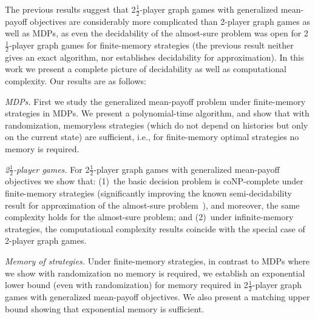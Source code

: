 \documentclass{article}
\newcommand{\half}{$\frac{\text{1}}{\text{2}}$}
\begin{document}
\smallskip{}
The previous results suggest that 2\half-player graph games with generalized 
mean-payoff objectives are considerably more complicated than 2-player graph 
games as well as MDPs, as even the decidability of the almost-sure problem was 
open for 2\half-player graph games for finite-memory strategies (the previous 
result neither gives an exact algorithm, nor establishes decidability for 
approximation).
In this work we present a complete picture of decidability as well as computational 
complexity. 
Our results are as follows:
\begin{compactenum}

\item {\em MDPs.} First we study the generalized mean-payoff problem under 
finite-memory strategies in MDPs. We present a polynomial-time algorithm,
and show that with randomization, memoryless strategies (which do not depend on
histories but only on the current state) are sufficient,
i.e., for finite-memory optimal strategies no memory is required.

\item {\em 2\half-player games.} 
For 2\half-player graph games with generalized mean-payoff objectives we show 
that: 
(1)~the basic decision problem is coNP-complete under finite-memory strategies (significantly improving 
the known semi-decidability result for approximation of the almost-sure 
problem~\cite{BKTW15}), and moreover, the same complexity holds for the almost-sure problem; 
and (2)~under infinite-memory strategies, the computational complexity results 
coincide with the special case of 2-player graph games.

\item {\em Memory of strategies.} Under finite-memory strategies, 
in contrast to MDPs where we show with randomization no memory is required,
we establish an exponential lower bound (even with randomization) for memory 
required in 2\half-player graph games with generalized mean-payoff objectives.
We also present a matching upper bound showing that exponential memory
is sufficient.
\end{compactenum}
\end{document}
